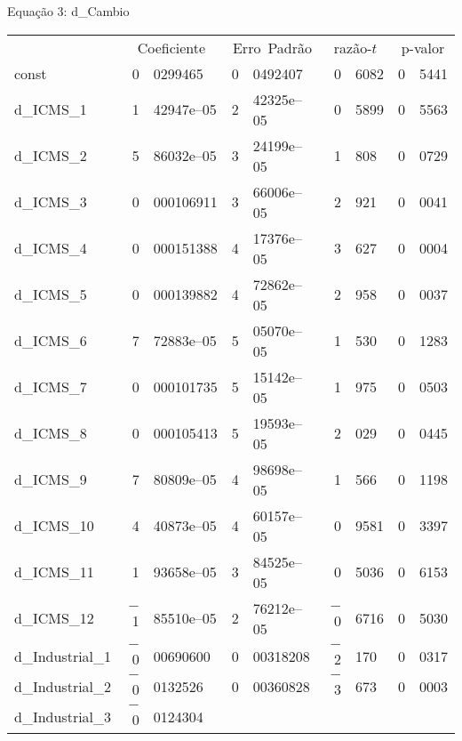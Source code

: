 \documentclass[11pt]{article}
\begin{document}
\begin{center}

Equação 3: d\_Cambio\\

\vspace{1em}

\begin{tabular}{lr@{,}lr@{,}lr@{,}lr@{,}l}
  &
 \multicolumn{2}{c}{Coeficiente} &
  \multicolumn{2}{c}{Erro\ Padrão} &
   \multicolumn{2}{c}{razão-$t$} &
    \multicolumn{2}{c}{p-valor} \\[1ex]
const &
  0&0299465 &
    0&0492407 &
      0&6082 &
        0&5441 \\
d\_ICMS\_1 &
  1&42947\textrm{e--05} &
    2&42325\textrm{e--05} &
      0&5899 &
        0&5563 \\
d\_ICMS\_2 &
  5&86032\textrm{e--05} &
    3&24199\textrm{e--05} &
      1&808 &
        0&0729 \\
d\_ICMS\_3 &
  0&000106911 &
    3&66006\textrm{e--05} &
      2&921 &
        0&0041 \\
d\_ICMS\_4 &
  0&000151388 &
    4&17376\textrm{e--05} &
      3&627 &
        0&0004 \\
d\_ICMS\_5 &
  0&000139882 &
    4&72862\textrm{e--05} &
      2&958 &
        0&0037 \\
d\_ICMS\_6 &
  7&72883\textrm{e--05} &
    5&05070\textrm{e--05} &
      1&530 &
        0&1283 \\
d\_ICMS\_7 &
  0&000101735 &
    5&15142\textrm{e--05} &
      1&975 &
        0&0503 \\
d\_ICMS\_8 &
  0&000105413 &
    5&19593\textrm{e--05} &
      2&029 &
        0&0445 \\
d\_ICMS\_9 &
  7&80809\textrm{e--05} &
    4&98698\textrm{e--05} &
      1&566 &
        0&1198 \\
d\_ICMS\_10 &
  4&40873\textrm{e--05} &
    4&60157\textrm{e--05} &
      0&9581 &
        0&3397 \\
d\_ICMS\_11 &
  1&93658\textrm{e--05} &
    3&84525\textrm{e--05} &
      0&5036 &
        0&6153 \\
d\_ICMS\_12 &
  $-$1&85510\textrm{e--05} &
    2&76212\textrm{e--05} &
      $-$0&6716 &
        0&5030 \\
d\_Industrial\_1 &
  $-$0&00690600 &
    0&00318208 &
      $-$2&170 &
        0&0317 \\
d\_Industrial\_2 &
  $-$0&0132526 &
    0&00360828 &
      $-$3&673 &
        0&0003 \\
d\_Industrial\_3 &
  $-$0&0124304 &

\end{tabular}
\end{center}
\end{document}
